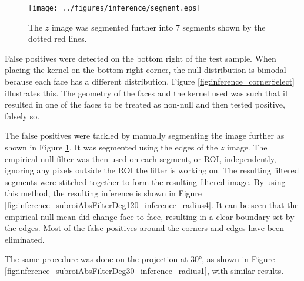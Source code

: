 \begin{figure}
  \centering
  \texttt{[image: ../figures/inference/segment.eps]}
  \caption{The $z$ image was segmented further into 7 segments shown by the dotted red lines.}
  \label{fig:inference_segmentFurther}
\end{figure}

False positives were detected on the bottom right of the test sample. When placing the kernel on the bottom right corner, the null distribution is bimodal because each face has a different distribution. Figure \ref{fig:inference_cornerSelect} illustrates this. The geometry of the faces and the kernel used was such that it resulted in one of the faces to be treated as non-null and then tested positive, falsely so.

The false positives were tackled by manually segmenting the image further as shown in Figure \ref{fig:inference_segmentFurther}. It was segmented using the edges of the $z$ image. The empirical null filter was then used on each segment, or ROI, independently, ignoring any pixels outside the ROI the filter is working on. The resulting filtered segments were stitched together to form the resulting filtered image. By using this method, the resulting inference is shown in Figure \ref{fig:inference_subroiAbsFilterDeg120_inference_radius4}. It can be seen that the empirical null mean did change face to face, resulting in a clear boundary set by the edges. Most of the false positives around the corners and edges have been eliminated.

The same procedure was done on the projection at \ang{30}, as shown in Figure \ref{fig:inference_subroiAbsFilterDeg30_inference_radius1}, with similar results.

